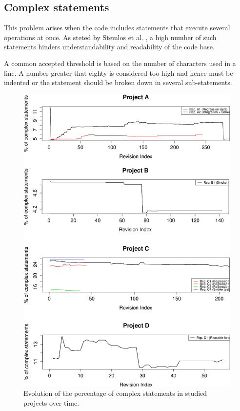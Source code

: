 \subsection{Complex statements}
This problem arises when the code includes statements that execute several operations at once. As steted by Stemlos et al. \cite{metrics_source_code}, a high number of such statements hinders understandability and readability of the code base.

A common accepted threshold is based on the number of characters used in a line. A number greater that eighty is considered too high and hence must be indented or the statement should be broken down in several sub-statements.

\begin{figure}[!htbp]
    \centering
    \includegraphics[width=\textwidth,keepaspectratio]{figure/results/rq1/perc-complex-statements.pdf}
    \caption{Evolution of the percentage of complex statements in studied projects over time.}
    \label{fig:perc-complex-statements}
\end{figure}



